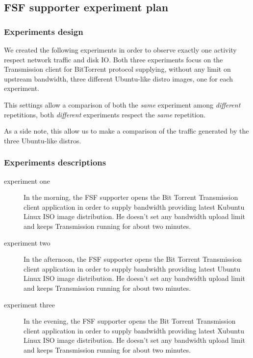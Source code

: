 \documentclass[10pt,a4paper]{article}
\begin{document}
    \newpage
    \subsection{FSF supporter experiment plan}

    \subsubsection*{Experiments design }
    We created the following experiments in order to observe exactly
    one activity respect network traffic and disk IO. Both three
    experiments focus on the Transmission client for BitTorrent
    protocol supplying, without any limit on upstream bandwidth, three
    different Ubuntu-like distro images, one for each experiment.

    This settings allow a comparison of both the \emph{same}
    experiment among \emph{different} repetitions, both
    \emph{different} experiments respect the \emph{same} repetition.

    As a side note, this allow us to make a comparison of the traffic
    generated by the three Ubuntu-like distros.

    \subsubsection*{Experiments descriptions}
    
    \begin{description}
    \item[experiment one] In the morning, the FSF supporter opens the
      Bit Torrent Transmission client application in order to supply
      bandwidth providing latest Kubuntu Linux ISO image
      distribution. He doesn't set any bandwidth upload limit and
      keeps Transmission running for about two minutes.
    \item[experiment two] In the afternoon, the FSF supporter opens
      the Bit Torrent Transmission client application in order to
      supply bandwidth providing latest Ubuntu Linux ISO image
      distribution. He doesn't set any bandwidth upload limit and
      keeps Transmission running for about two minutes.
    \item[experiment three] In the evening, the FSF supporter opens
      the Bit Torrent Transmission client application in order to
      supply bandwidth providing latest Xubuntu Linux ISO image
      distribution. He doesn't set any bandwidth upload limit and
      keeps Transmission running for about two minutes.
    \end{description}
\end{document}
